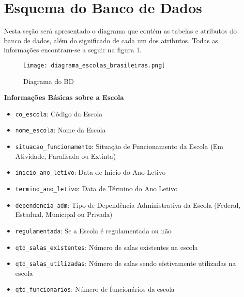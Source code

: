 \documentclass[12pt,a4paper]{article}
\begin{document}
\section{Esquema do Banco de Dados}

Nesta seção será apresentado o diagrama que contém as tabelas e atributos do banco de dados, além do significado de cada um dos atributos. Todas as informações encontram-se a seguir na figura 1.

\begin{figure}[h]
    \centering
    \texttt{[image: diagrama\_escolas\_brasileiras.png]}
    \caption{Diagrama do BD}
    \label{fig:diagrama}
\end{figure}

\pagebreak


\begin{flushleft}
    \textbf{Informações Básicas sobre a Escola}
\end{flushleft}

\begin{itemize}

    \item \texttt{co\_escola}: Código da Escola

    \item \texttt{nome\_escola}: Nome da Escola

    \item \texttt{situacao\_funcionamento}: Situação de Funcionamento da Escola (Em Atividade, Paralisada ou Extinta)

    \item \texttt{inicio\_ano\_letivo}: Data de Início do Ano Letivo

    \item \texttt{termino\_ano\_letivo}: Data de Término do Ano Letivo
    
    \item \texttt{dependencia\_adm}: Tipo de Dependência Administrativa da Escola (Federal, Estadual, Municipal ou Privada)

    \item \texttt{regulamentada}: Se a Escola é regulamentada ou não

    \item \texttt{qtd\_salas\_existentes}: Número de salas existentes na escola

    \item \texttt{qtd\_salas\_utilizadas}: Número de salas sendo efetivamente utilizadas na escola

    \item \texttt{qtd\_funcionarios}: Número de funcionários da escola

\end{itemize}
\end{document}

